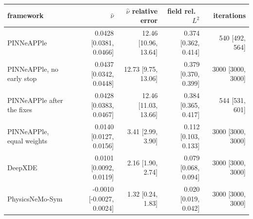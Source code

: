 \begin{tabular}{lrrrr}
\toprule
framework & $\hat\nu$ & $\hat\nu$ relative error & field rel.\ $L^2$ & iterations \\
\midrule
PINNeAPPle & 0.0428 [0.0381, 0.0466] & 12.46 [10.96, 13.64] & 0.374 [0.362, 0.414] & 540 [492, 564] \\
PINNeAPPle, no early stop & 0.0437 [0.0342, 0.0448] & 12.73 [9.75, 13.06] & 0.379 [0.370, 0.399] & 3000 [3000, 3000] \\
PINNeAPPle after the fixes & 0.0428 [0.0383, 0.0467] & 12.46 [11.03, 13.66] & 0.384 [0.365, 0.417] & 544 [531, 601] \\
PINNeAPPle, equal weights & 0.0140 [0.0127, 0.0156] & 3.41 [2.99, 3.90] & 0.112 [0.103, 0.133] & 3000 [3000, 3000] \\
DeepXDE & 0.0101 [0.0092, 0.0119] & 2.16 [1.90, 2.74] & 0.079 [0.068, 0.094] & 3000 [3000, 3000] \\
PhysicsNeMo-Sym & -0.0010 [-0.0027, 0.0024] & 1.32 [0.24, 1.83] & 0.020 [0.019, 0.042] & 3000 [3000, 3000] \\
\bottomrule
\end{tabular}
